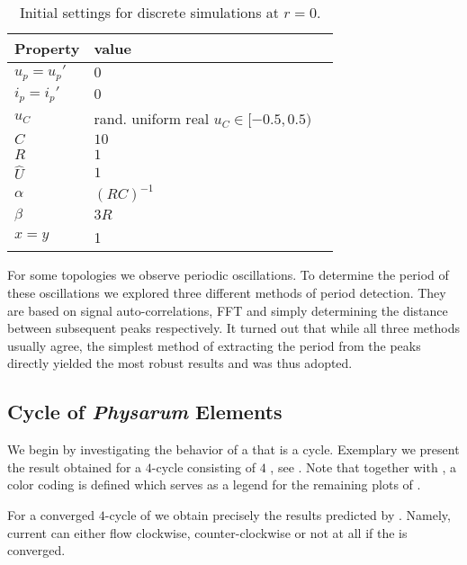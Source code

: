 	\begin{table}
        \centering
        \begin{tabular}{@{} l *2l @{}}
        \toprule
         \multicolumn{1}{c}{Property}    & value  \\ 
        \midrule
         $u_p = u_p'$ & $0$   \\ 
         $i_p = i_p'$ & $0$   \\ 
         $u_C$ & rand. uniform real $u_C \in [ -0.5 , 0.5 )$   \\ 
         $C$ & $10$ \\
         $R$ & $1$ \\
         $\hat{U}$ & $1$ \\
         $\alpha$ & $(R C)^{-1}$ \\
         $\beta$ & $3 R$ \\
         $x = y$ & 1 \\
        \bottomrule
        \end{tabular}
        \caption[Simulation - Initial values]{Initial settings for discrete simulations at $r=0$.}
        \label{tab:initialization}
     \end{table}

     For some topologies we observe periodic oscillations. To determine the period of these oscillations we explored three different methods of period detection. They are based on signal auto-correlations, FFT and simply determining the distance between subsequent peaks respectively. It turned out that while all three methods usually agree, the simplest method of extracting the period from the peaks directly yielded the most robust results and was thus adopted.

	\subsection{Cycle of \emph{Physarum} Elements}

		We begin by investigating the behavior of a \Pn that is a cycle. Exemplary we present the result obtained for a $4$-cycle consisting of $4$ \Pes, see . Note that together with , a color coding is defined which serves as a legend for the remaining plots of .

		For a converged $4$-cycle of \Pes we obtain precisely the results predicted by . Namely, current can either flow clockwise, counter-clockwise or not at all if the \Pn is converged. 

